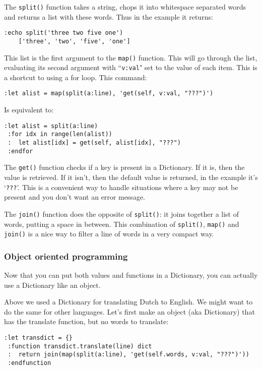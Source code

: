 The \texttt{split()} function takes a string, chops it into whitespace separated words and returns a list with these words.
Thus in the example it returns:

\begin{Verbatim}[samepage=true]
 :echo split('three two five one')
    ['three', 'two', 'five', 'one']
\end{Verbatim}

This list is the first argument to the \texttt{map()} function.
This will go through the list, evaluating its second argument with ``\texttt{v:val}" set to the value of each item.
This is a shortcut to using a for loop.
This command:

\begin{Verbatim}[samepage=true]
 :let alist = map(split(a:line), 'get(self, v:val, "???")')
\end{Verbatim}

Is equivalent to:

\begin{Verbatim}[samepage=true]
 :let alist = split(a:line)
 :for idx in range(len(alist))
 :  let alist[idx] = get(self, alist[idx], "???")
 :endfor
\end{Verbatim}

The \texttt{get()} function checks if a key is present in a Dictionary.
If it is, then the value is retrieved.
If it isn't, then the default value is returned, in the example it's `\texttt{???}'.
This is a convenient way to handle situations where a key may not be present and you don't want an error message.

The \texttt{join()} function does the opposite of \texttt{split()}: it joins together a list of words, putting a space in between.
This combination of \texttt{split()}, \texttt{map()} and \texttt{join()} is a nice way to filter a line of words in a very compact way.

\subsubsection{Object oriented programming}
Now that you can put both values and functions in a Dictionary, you can actually use a Dictionary like an object.

Above we used a Dictionary for translating Dutch to English.
We might want to do the same for other languages.
Let's first make an object (aka Dictionary) that has the translate function, but no words to translate:

\begin{Verbatim}[samepage=true]
 :let transdict = {}
 :function transdict.translate(line) dict
 :  return join(map(split(a:line), 'get(self.words, v:val, "???")'))
 :endfunction
\end{Verbatim}

